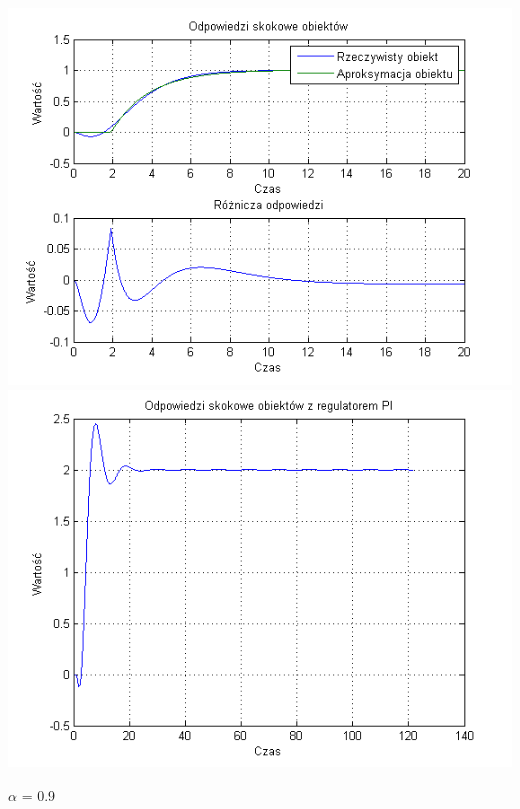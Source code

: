 \documentclass[10pt,a4paper]{article}
\begin{document}
\begin{center}
\includegraphics[scale=1]{images/jeden/skrypt_239.png}\\
\includegraphics[scale=1]{images/jeden/skrypt_240.png}\\
\end{center}
\newpage
$\alpha$ = 0.9
\end{document}
